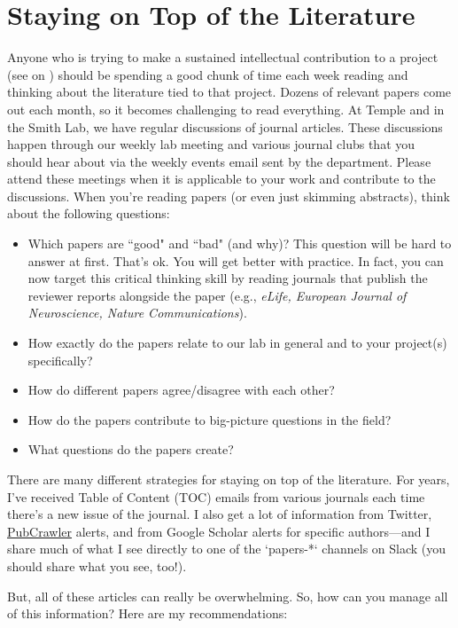 \documentclass[letterpaper,11pt,oneside]{memoir}
\begin{document}
\section{Staying on Top of the Literature}
\label{sec:literature}

Anyone who is trying to make a sustained intellectual contribution to a project (see  on ) should be spending a good chunk of time each week reading and thinking about the literature tied to that project. Dozens of relevant papers come out each month, so it becomes challenging to read everything. At Temple and in the Smith Lab, we have regular discussions of journal articles. These discussions happen through our weekly lab meeting and various journal clubs that you should hear about via the weekly events email sent by the department. Please attend these meetings when it is applicable to your work and contribute to the discussions. When you're reading papers (or even just skimming abstracts), think about the following questions:

\begin{itemize}
\item Which papers are ``good" and ``bad" (and why)? This question will be hard to answer at first. That's ok. You will get better with practice. In fact, you can now target this critical thinking skill by reading journals that publish the reviewer reports alongside the paper (e.g., \textit{eLife, European Journal of Neuroscience, Nature Communications}).
\item How exactly do the papers relate to our lab in general and to your project(s) specifically?
\item How do different papers agree/disagree with each other?
\item How do the papers contribute to big-picture questions in the field? 
\item What questions do the papers create?  
\end{itemize}

There are many different strategies for staying on top of the literature. For years, I've received Table of Content (TOC) emails from various journals each time there's a new issue of the journal. I also get a lot of information from Twitter, \href{http://pubcrawler.gen.tcd.ie/}{PubCrawler} alerts, and from Google Scholar alerts for specific authors---and I share much of what I see directly to one of the `papers-*` channels on Slack (you should share what you see, too!).

But, all of these articles can really be overwhelming. So, how can you manage all of this information? Here are my recommendations:
\end{document}
